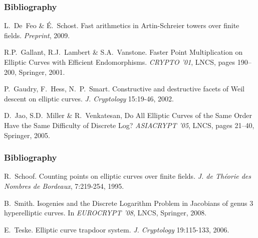 \documentclass[10pt]{beamer}
\newcommand{\0}{\mathcal{O}}  %
\begin{document}
\begin{frame}
  \frametitle{Bibliography}

  \begin{thebibliography}{1}

   L.~De~Feo \& É.~Schost.  \newblock
    Fast arithmetics in Artin-Schreier towers over finite fields.
    \newblock \emph{Preprint}, 2009.

    R.P.~Gallant, R.J.~Lambert \& S.A.~Vanstone.
    \newblock Faster Point Multiplication on Elliptic Curves
    with Efficient Endomorphisms.
    \newblock \emph{CRYPTO '01}, LNCS, pages 190--200, Springer, 2001.
    
    P.~Gaudry, F.~Hess, N.~P.~Smart.
    \newblock Constructive and destructive facets of Weil
    descent on elliptic curves.
    \newblock \emph{J. Cryptology} 15:19-46, 2002.

    D.~Jao, S.D.~Miller \& R.~Venkatesan,
    \newblock Do All Elliptic Curves of the Same Order Have the Same 
    Difficulty of Discrete Log?
    \newblock \emph{ASIACRYPT '05}, LNCS, pages 21--40, Springer, 2005.

  \end{thebibliography}
\end{frame}

\begin{frame}
  \frametitle{Bibliography}

  \begin{thebibliography}{1}

   R.~Schoof. \newblock Counting points on
    elliptic curves over finite fields. \newblock \emph{J. de Théorie
      des Nombres de Bordeaux}, 7:219-254, 1995.

   B.~Smith.  \newblock Isogenies and the
    Discrete Logarithm Problem in Jacobians of genus $3$ hyperelliptic
    curves.
    \newblock In \emph{EUROCRYPT '08}, LNCS, Springer, 2008.

   E.~Teske. \newblock Elliptic curve
    trapdoor system. \newblock \emph{J. Cryptology} 19:115-133, 2006.

  \end{thebibliography}
\end{frame}
\end{document}
